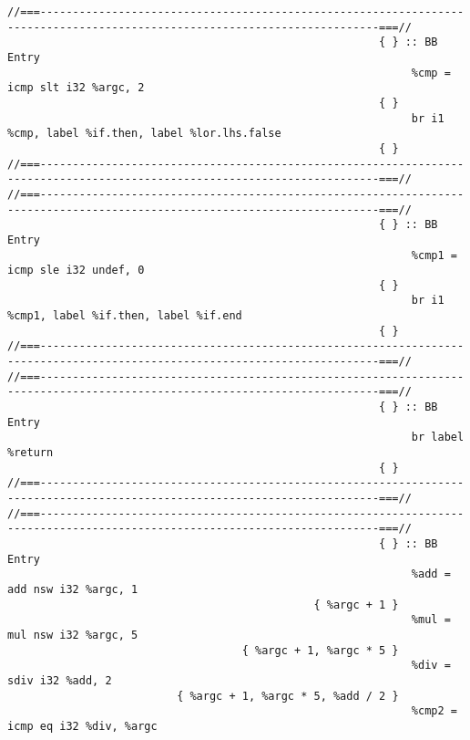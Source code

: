 \begingroup
\fontsize{6pt}{8pt}\selectfont
\begin{verbatim}
//===--------------------------------------------------------------------------------------------------------------------------===//
                                                         { } :: BB Entry
                                                              %cmp = icmp slt i32 %argc, 2
                                                         { }
                                                              br i1 %cmp, label %if.then, label %lor.lhs.false
                                                         { }
//===--------------------------------------------------------------------------------------------------------------------------===//
//===--------------------------------------------------------------------------------------------------------------------------===//
                                                         { } :: BB Entry
                                                              %cmp1 = icmp sle i32 undef, 0
                                                         { }
                                                              br i1 %cmp1, label %if.then, label %if.end
                                                         { }
//===--------------------------------------------------------------------------------------------------------------------------===//
//===--------------------------------------------------------------------------------------------------------------------------===//
                                                         { } :: BB Entry
                                                              br label %return
                                                         { }
//===--------------------------------------------------------------------------------------------------------------------------===//
//===--------------------------------------------------------------------------------------------------------------------------===//
                                                         { } :: BB Entry
                                                              %add = add nsw i32 %argc, 1
                                               { %argc + 1 }
                                                              %mul = mul nsw i32 %argc, 5
                                    { %argc + 1, %argc * 5 }
                                                              %div = sdiv i32 %add, 2
                          { %argc + 1, %argc * 5, %add / 2 }
                                                              %cmp2 = icmp eq i32 %div, %argc

\end{verbatim}
